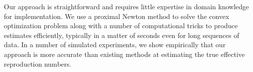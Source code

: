 
Our approach is straightforward and requires little expertise in domain
knowledge for implementation. 
% 
We use a proximal Newton method to solve the convex optimization problem along
with a number of computational tricks to produce estimates efficiently,
typically in a matter of seconds even for long sequences of data.
In a number of simulated experiments, we show empirically that our approach is
more accurate than existing methods at estimating the true effective reproduction numbers. 

